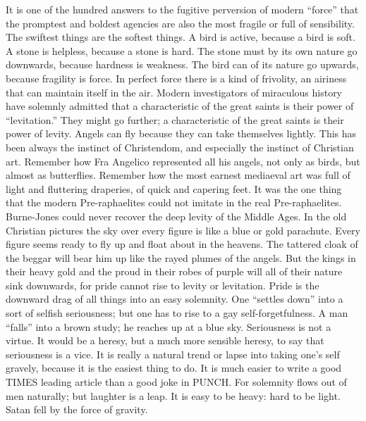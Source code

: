 It is one of the hundred answers to the fugitive perversion of modern “force” that the promptest and boldest agencies are also the most fragile or full of sensibility. The swiftest things are the softest things. A bird is active, because a bird is soft. A stone is helpless, because a stone is hard. The stone must by its own nature go downwards, because hardness is weakness. The bird can of its nature go upwards, because fragility is force. In perfect force there is a kind of frivolity, an airiness that can maintain itself in the air. Modern investigators of miraculous history have solemnly admitted that a characteristic of the great saints is their power of “levitation.” They might go further; a characteristic of the great saints is their power of levity. Angels can fly because they can take themselves lightly. This has been always the instinct of Christendom, and especially the instinct of Christian art. Remember how Fra Angelico represented all his angels, not only as birds, but almost as butterflies. Remember how the most earnest mediaeval art was full of light and fluttering draperies, of quick and capering feet. It was the one thing that the modern Pre-raphaelites could not imitate in the real Pre-raphaelites. Burne-Jones could never recover the deep levity of the Middle Ages. In the old Christian pictures the sky over every figure is like a blue or gold parachute. Every figure seems ready to fly up and float about in the heavens. The tattered cloak of the beggar will bear him up like the rayed plumes of the angels. But the kings in their heavy gold and the proud in their robes of purple will all of their nature sink downwards, for pride cannot rise to levity or levitation. Pride is the downward drag of all things into an easy solemnity. One “settles down” into a sort of selfish seriousness; but one has to rise to a gay self-forgetfulness. A man “falls” into a brown study; he reaches up at a blue sky. Seriousness is not a virtue. It would be a heresy, but a much more sensible heresy, to say that seriousness is a vice. It is really a natural trend or lapse into taking one’s self gravely, because it is the easiest thing to do. It is much easier to write a good TIMES leading article than a good joke in PUNCH. For solemnity flows out of men naturally; but laughter is a leap. It is easy to be heavy: hard to be light. Satan fell by the force of gravity.

